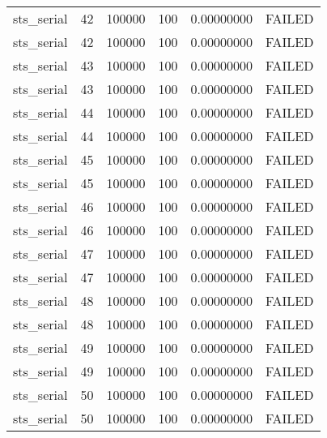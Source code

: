 \begin{longtable}{cccccc}
sts\_serial & 42 & 100000 & 100 & 0.00000000 & FAILED \\
sts\_serial & 42 & 100000 & 100 & 0.00000000 & FAILED \\
sts\_serial & 43 & 100000 & 100 & 0.00000000 & FAILED \\
sts\_serial & 43 & 100000 & 100 & 0.00000000 & FAILED \\
sts\_serial & 44 & 100000 & 100 & 0.00000000 & FAILED \\
sts\_serial & 44 & 100000 & 100 & 0.00000000 & FAILED \\
sts\_serial & 45 & 100000 & 100 & 0.00000000 & FAILED \\
sts\_serial & 45 & 100000 & 100 & 0.00000000 & FAILED \\
sts\_serial & 46 & 100000 & 100 & 0.00000000 & FAILED \\
sts\_serial & 46 & 100000 & 100 & 0.00000000 & FAILED \\
sts\_serial & 47 & 100000 & 100 & 0.00000000 & FAILED \\
sts\_serial & 47 & 100000 & 100 & 0.00000000 & FAILED \\
sts\_serial & 48 & 100000 & 100 & 0.00000000 & FAILED \\
sts\_serial & 48 & 100000 & 100 & 0.00000000 & FAILED \\
sts\_serial & 49 & 100000 & 100 & 0.00000000 & FAILED \\
sts\_serial & 49 & 100000 & 100 & 0.00000000 & FAILED \\
sts\_serial & 50 & 100000 & 100 & 0.00000000 & FAILED \\
sts\_serial & 50 & 100000 & 100 & 0.00000000 & FAILED \\
\bottomrule
\end{longtable}



